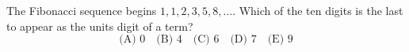 The Fibonacci sequence begins $1,1,2,3,5,8,\ldots$. Which of the ten digits is the last to appear as the units digit of a term?
\[
\text{(A) }0\quad\text{(B) }4\quad\text{(C) }6\quad\text{(D) }7\quad\text{(E) }9
\]
